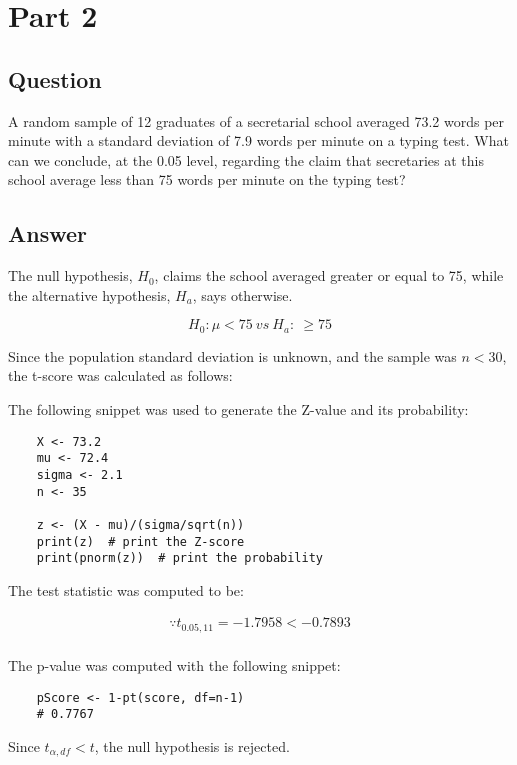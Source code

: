 \section{Part 2}
    \subsection{Question}
    A random sample of 12 graduates of a secretarial school averaged 73.2 words per minute with a standard deviation of 7.9 words per minute on a typing test. What can we conclude, at the 0.05 level, regarding the claim that secretaries at this school average less than 75 words per minute on the typing test?

    \subsection{Answer}
    The null hypothesis, $H_{0}$, claims the school averaged greater or equal to 75, while the alternative hypothesis, $H_{a}$, says otherwise.

        \[ H_{0}: \mu < 75 \ vs \ H_{a}: \ \geq 75 \]

    Since the population standard deviation is unknown, and the sample was $n < 30$, the t-score was calculated as follows:

        

    The following snippet was used to generate the Z-value and its probability:
\begin{lstlisting}
    X <- 73.2
    mu <- 72.4
    sigma <- 2.1
    n <- 35

    z <- (X - mu)/(sigma/sqrt(n))
    print(z)  # print the Z-score
    print(pnorm(z))  # print the probability
\end{lstlisting}

    The test statistic was computed to be:

        \begin{align*}
            \because t_{0.05,11}=-1.7958 < -0.7893\\
        \end{align*}

    The p-value was computed with the following snippet:
\begin{lstlisting}
    pScore <- 1-pt(score, df=n-1)
    # 0.7767
\end{lstlisting}

    Since $t_{\alpha, df} < t$, the null hypothesis is rejected.
